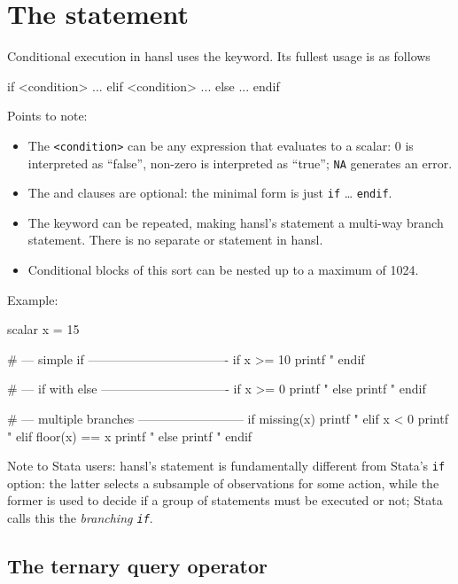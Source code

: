 \section{The  statement}

Conditional execution in hansl uses the  keyword. Its fullest
usage is as follows
\begin{code}
if <condition>
   ...
elif <condition>
   ...
else 
   ...
endif  
\end{code}

Points to note:
\begin{itemize}
\item The \texttt{<condition>} can be any expression that evaluates to a
  scalar: 0 is interpreted as ``false'', non-zero is interpreted as
  ``true''; \texttt{NA} generates an error.
\item The  and  clauses are optional: the minimal
  form is just \texttt{if} \dots{} \texttt{endif}.
\item The  keyword can be repeated, making hansl's 
  statement a multi-way branch statement. There is no separate
   or  statement in hansl.
\item Conditional blocks of this sort can be nested up to a maximum of
  1024.
\end{itemize}

Example:
\begin{code}
scalar x = 15

# --- simple if ----------------------------------
if x >= 10
   printf "%
endif

# --- if with else -------------------------------
if x >= 0
   printf "%
else
   printf "%
endif

# --- multiple branches --------------------------
if missing(x)
   printf "%
elif x < 0
   printf "%
elif floor(x) == x
   printf "%
else
   printf "%
endif
\end{code}

Note to Stata users: hansl's  statement is fundamentally
different from Stata's \texttt{if} option: the latter selects a
subsample of observations for some action, while the former is used to
decide if a group of statements must be executed or not; Stata calls
this the \emph{branching \texttt{if}}.

\subsection{The ternary query operator}

